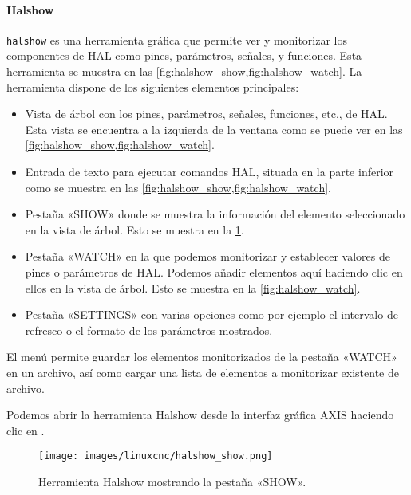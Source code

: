 \documentclass[english,spanish,a4paper,11pt]{article}
\begin{document}

\paragraph{Halshow}\hfill\medskip

\texttt{halshow} es una herramienta gráfica que permite ver y monitorizar los componentes de \ac{HAL} como pines, parámetros, señales, y funciones. Esta herramienta se muestra en las \cref{fig:halshow_show,fig:halshow_watch}. La herramienta dispone de los siguientes elementos principales:
%
\begin{itemize}
    \item Vista de árbol con los pines, parámetros, señales, funciones, etc., de \ac{HAL}. Esta vista se encuentra a la izquierda de la ventana como se puede ver en las \cref{fig:halshow_show,fig:halshow_watch}.

    \item Entrada de texto para ejecutar comandos \ac{HAL}, situada en la parte inferior como se muestra en las \cref{fig:halshow_show,fig:halshow_watch}.

    \item Pestaña «SHOW» donde se muestra la información del elemento seleccionado en la vista de árbol. Esto se muestra en la \cref{fig:halshow_show}.

    \item Pestaña «WATCH» en la que podemos monitorizar y establecer valores de pines o parámetros de \ac{HAL}. Podemos añadir elementos aquí haciendo clic en ellos en la vista de árbol. Esto se muestra en la \cref{fig:halshow_watch}.

    \item Pestaña «SETTINGS» con varias opciones como por ejemplo el intervalo de refresco o el formato de los parámetros mostrados.
\end{itemize}

El menú  permite guardar los elementos monitorizados de la pestaña «WATCH» en un archivo, así como cargar una lista de elementos a monitorizar existente de archivo.

Podemos abrir la herramienta Halshow desde la interfaz gráfica AXIS haciendo clic en .

\begin{figure}[!ht]
    \centering
    \texttt{[image: images/linuxcnc/halshow\_show.png]}
    \caption{Herramienta Halshow mostrando la pestaña «SHOW».}
    \label{fig:halshow_show}
\end{figure}
\end{document}
